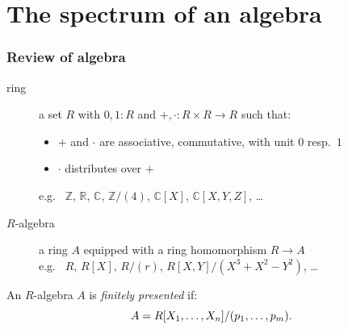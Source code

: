\documentclass[aspectratio=1610]{beamer}
\begin{document}
\section{The spectrum of an algebra}

\begin{frame}
  \frametitle{Review of algebra}

  \begin{description}
    \item[ring]
      a set $R$ with $0, 1 : R$ and ${+}, {\cdot} : R \times R \to R$ such that:
      \begin{itemize}
        \item
          $+$ and $\cdot$ are associative, commutative, with unit $0$ resp.\ $1$
        \item
          $\cdot$ distributes over $+$
      \end{itemize}
      {
      e.g.\ %
      $\mathbb{Z}$,
      $\mathbb{R}$,
      $\mathbb{C}$,
      $\mathbb{Z}/(4)$,
      $\mathbb{C}[X]$,
      $\mathbb{C}[X, Y, Z]$,
      \dots}
      \pause%
    \item[$R$-algebra]
      a ring $A$ equipped with a ring homomorphism $R \to A$\\
      {
      e.g.\ %
      $R$,
      $R[X]$,
      $R/(r)$,
      $R[X, Y]/(X^3 + X^2 - Y^2)$,
      \dots}
  \end{description}

  \pause%
  \bigskip
  \bigskip
  An $R$-algebra $A$ is \emph{finitely presented} if:
  \[ A = R[X_1, \dots, X_n]/(p_1, \dots, p_m) \rlap{.}\]
\end{frame}
\end{document}
